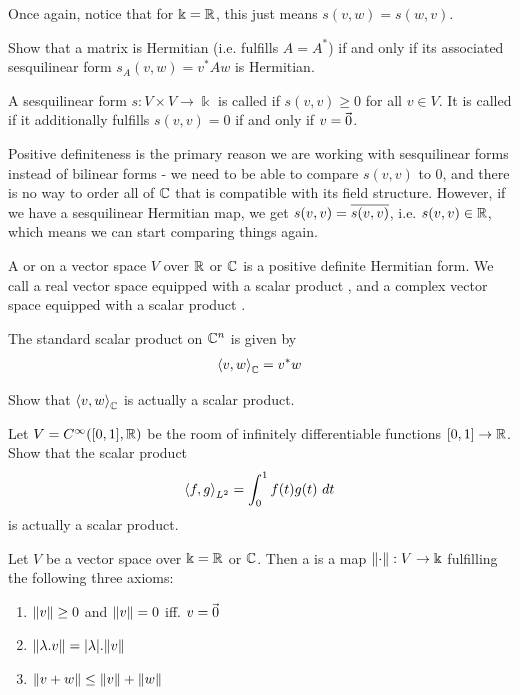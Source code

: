 Once again, notice that for $\Bbbk = \mathbb{R}$, this just means $s(v,w) = s(w,v)$.
\begin{exercise}
	Show that a matrix is Hermitian (i.e. fulfills $A = A^*$) if and only if its associated sesquilinear form $s_A(v,w) = v^*Aw$ is Hermitian.
\end{exercise}
\begin{definition}
	A sesquilinear form $s : V \times V \to \Bbbk$ is called  if $s(v,v) \geq 0$ for all $v \in V$. It is called  if it additionally fulfills $s(v,v) = 0$ if and only if $v = \kern-1.2pt\vec{\kern1.2pt 0}$.
\end{definition}
Positive definiteness is the primary reason we are working with sesquilinear forms instead of bilinear forms - we need to be able to compare $s(v,v)$ to $0$, and there is no way to order all of $\mathbb{C}$ that is compatible with its field structure. However, if we have a sesquilinear Hermitian map, we get $s(v,v) = \overline{{s(v,v)}}$, i.e. $s(v,v) \in \mathbb{R}$, which means we can start comparing things again.
\begin{definition}
	A  or  on a vector space $V$ over $\mathbb{R}$ or $\mathbb{C}$ is a positive definite Hermitian form. We call a real vector space equipped with a scalar product , and a complex vector space equipped with a scalar product .
\end{definition}
\begin{definition}
	The standard scalar product on $\mathbb{C}^n$ is given by
	\begin{align*}
		\left\langle v, w \right\rangle_{\mathbb{C}} = v^* w
	\end{align*}
\end{definition}
\begin{exercise}
	Show that $\left\langle v, w \right\rangle_{\mathbb{C}}$ is actually a scalar product.
\end{exercise}
\begin{exercise}
	Let $V = C^\infty([0,1],\mathbb{R})$ be the room of infinitely differentiable functions $[0,1] \to \mathbb{R}$. Show that the  scalar product
	\begin{align*}
		\left\langle f, g \right\rangle_{L^2} = \int_0^1 f(t) g(t) ~dt
	\end{align*}
	is actually a scalar product.
\end{exercise}
\begin{definition}
	Let $V$ be a vector space over $\Bbbk = \mathbb{R}$ or $\mathbb{C}$. Then a  is a map $\norm{\cdot} : V \to \Bbbk$ fulfilling the following three axioms:
	\begin{enumerate}
		\item {} $\norm{v} \geq 0$ and $\norm{v} = 0$ iff. $v = \kern-1.2pt\vec{\kern1.2pt 0}$
		\item {} $\norm{\lambda.v} = \abs{\lambda} . \norm{v}$
		\item {} $\norm{v + w} \leq \norm{v} + \norm{w}$
	\end{enumerate}
\end{definition}
